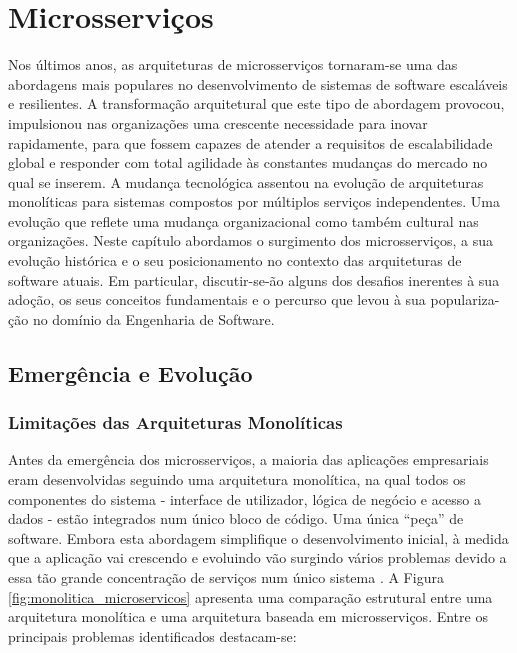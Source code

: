 \chapter{Microsserviços}

Nos últimos anos, as arquiteturas de microsserviços tornaram-se uma das abordagens mais populares no desenvolvimento de sistemas de software escaláveis e resilientes. A transformação arquitetural que este tipo de abordagem provocou, impulsionou nas organizações uma crescente necessidade para inovar rapidamente, para que fossem capazes de atender a requisitos de escalabilidade global e responder com total agilidade às constantes mudanças do mercado no qual se inserem. A mudança tecnológica assentou na evolução de arquiteturas monolíticas para sistemas compostos por múltiplos serviços independentes. Uma evolução que reflete uma mudança organizacional como também cultural nas organizações. Neste capítulo abordamos o surgimento dos microsserviços, a sua evolução histórica e o seu posicionamento no contexto das arquiteturas de software atuais. Em particular, discutir-se-ão alguns dos desafios inerentes à sua adoção, os seus conceitos fundamentais e o percurso que levou à sua populariza-ção no domínio da Engenharia de Software.

\section{Emergência e Evolução}

\subsection{Limitações das Arquiteturas Monolíticas}

Antes da emergência dos microsserviços, a maioria das aplicações empresariais eram desenvolvidas seguindo uma arquitetura monolítica, na qual todos os componentes do sistema - interface de utilizador, lógica de negócio e acesso a dados - estão integrados num único bloco de código. Uma única “peça” de software. Embora esta abordagem simplifique o desenvolvimento inicial, à medida que a aplicação vai crescendo e evoluindo vão surgindo vários problemas devido a essa tão grande concentração de serviços num único sistema \cite{Villamizar2015}. A Figura \ref{fig:monolitica_microservicos} apresenta uma comparação estrutural entre uma arquitetura monolítica e uma arquitetura baseada em microsserviços. Entre os principais problemas identificados destacam-se:

